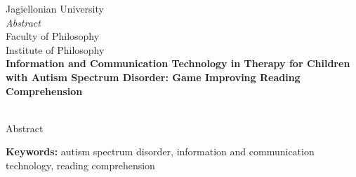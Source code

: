 \thispagestyle{firststyle}
{\centering\large
    \vspace{0.5cm}
    Jagiellonian University\\
    {\Huge\emph{Abstract}\\}
    \vspace{0.5cm}
    Faculty of Philosophy\\Institute of Philosophy\\
    \vspace{1cm}
    \textbf{Information and Communication Technology in Therapy for Children with Autism Spectrum Disorder: Game Improving Reading Comprehension\\}
    \vspace{0.5cm}
    \authorname\\
    \vspace{0.5cm}
}

Abstract

\vspace{1cm}
\noindent\textbf{Keywords:}
autism spectrum disorder, information and communication technology, reading comprehension